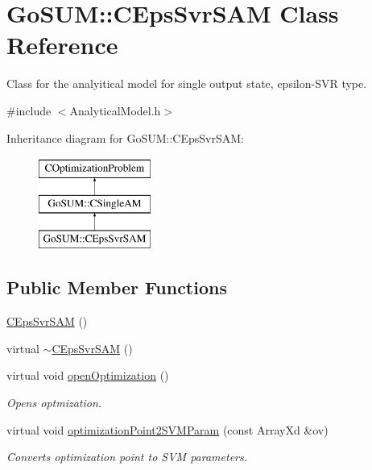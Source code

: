 \hypertarget{class_go_s_u_m_1_1_c_eps_svr_s_a_m}{\section{Go\-S\-U\-M\-:\-:C\-Eps\-Svr\-S\-A\-M Class Reference}
\label{class_go_s_u_m_1_1_c_eps_svr_s_a_m}
}


Class for the analyitical model for single output state, epsilon-\/\-S\-V\-R type.  




{\ttfamily \#include $<$Analytical\-Model.\-h$>$}

Inheritance diagram for Go\-S\-U\-M\-:\-:C\-Eps\-Svr\-S\-A\-M\-:\begin{figure}[H]
\begin{center}
\leavevmode
\includegraphics[height=3.000000cm]{class_go_s_u_m_1_1_c_eps_svr_s_a_m}
\end{center}
\end{figure}
\subsection*{Public Member Functions}
\begin{DoxyCompactItemize}
\item 
\hyperlink{class_go_s_u_m_1_1_c_eps_svr_s_a_m_aa3b33675066457d185fa2c0cab6edc4f}{C\-Eps\-Svr\-S\-A\-M} ()
\item 
virtual \hyperlink{class_go_s_u_m_1_1_c_eps_svr_s_a_m_a5490c6b8316c4fdf4b2a5124d50532a4}{$\sim$\-C\-Eps\-Svr\-S\-A\-M} ()
\item 
virtual void \hyperlink{class_go_s_u_m_1_1_c_eps_svr_s_a_m_a4ffdcbae7411ad49822e35957bbe2f44}{open\-Optimization} ()
\begin{DoxyCompactList}\small\item\em Opens optmization. \end{DoxyCompactList}\item 
virtual void \hyperlink{class_go_s_u_m_1_1_c_eps_svr_s_a_m_a44286934f7dad34f93aeefecda8bad18}{optimization\-Point2\-S\-V\-M\-Param} (const Array\-Xd \&ov)
\begin{DoxyCompactList}\small\item\em Converts optimization point to S\-V\-M parameters. \end{DoxyCompactList}\end{DoxyCompactItemize}
